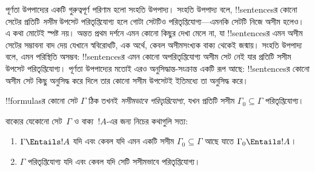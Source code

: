\documentclass[../../../include/open-logic-section]{subfiles}
\begin{document}
      {}
      {}


পূর্ণতা উপপাদ্যের একটি গুরুত্বপূর্ণ পরিণাম হলো সংহতি উপপাদ্য। সংহতি
উপপাদ্য বলে, !!{sentence}sর কোনো সেটের প্রতিটি \emph{সসীম} উপসেট
পরিতৃপ্তিযোগ্য হলে গোটা সেটটিও পরিতৃপ্তিযোগ্য—এমনকি সেটটি নিজে অসীম হলেও।
এ কথা মোটেই স্পষ্ট নয়। অন্তত প্রথম দর্শনে এমন কোনো কিছুর দেখা মেলে না,
যা !!{sentence}sর এমন অসীম সেটের সম্ভাবনা বাদ দেয় যেখানে স্ববিরোধটি,
এক অর্থে, কেবল অসীমসংখ্যক বাক্য থেকেই জন্মায়। সংহতি উপপাদ্য বলে, এমন
পরিস্থিতি অসম্ভব: !!{sentence}sর এমন কোনো অপরিতৃপ্তিযোগ্য অসীম সেট নেই
যার প্রতিটি সসীম উপসেট পরিতৃপ্তিযোগ্য। পূর্ণতা উপপাদ্যের মতোই এরও
অনুসিদ্ধান্ত-সংক্রান্ত একটি রূপ আছে: !!{sentence}sর কোনো অসীম সেট কিছু
অনুসিদ্ধ করে দিলে তার কোনো সসীম উপসেটই ইতিমধ্যে তা অনুসিদ্ধ করে।

\begin{defn}
  !!{formula}sর কোনো সেট $\Gamma$ ঠিক তখনই \emph{সসীমভাবে
  পরিতৃপ্তিযোগ্য}, যখন প্রতিটি সসীম $\Gamma_0 \subseteq \Gamma$
  পরিতৃপ্তিযোগ্য।
\end{defn}

\begin{thm}[সংহতি উপপাদ্য]
বাক্যের যেকোনো সেট~$\Gamma$ ও বাক্য~$!A$-এর জন্য নিচের কথাগুলি
সত্য:
\begin{enumerate}
  \item $\Gamma \Entails !A$ যদি এবং কেবল যদি এমন একটি সসীম
    $\Gamma_0 \subseteq \Gamma$ আছে যাতে $\Gamma_0 \Entails !A$।
  \item $\Gamma$ পরিতৃপ্তিযোগ্য যদি এবং কেবল যদি সেটি সসীমভাবে
    পরিতৃপ্তিযোগ্য।
\end{enumerate}
\end{thm}
\end{document}
